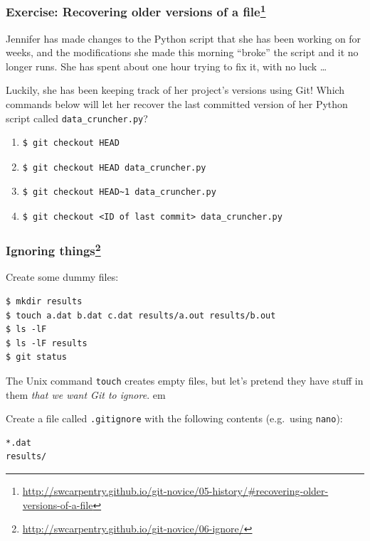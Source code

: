 \documentclass{beamer}
\newcommand{\correctans}{\textcolor{green!50!black}{\CheckmarkBold}}
\newcommand{\wrongans}{\textcolor{red!50!black}{\XSolidBold}}
\begin{document}
\begin{frame}[fragile]
\frametitle{Exercise: Recovering older versions of a file\footnote{\url{http://swcarpentry.github.io/git-novice/05-history/\#recovering-older-versions-of-a-file}}}

Jennifer has made changes to the Python script that she has been working on for weeks, and the modifications she made this morning ``broke'' the script and it no longer runs. She has spent about one hour trying to fix it, with no luck \dots \pause

Luckily, she has been keeping track of her project's versions using Git! Which commands below will let her recover the last committed version of her Python script called \texttt{data\_cruncher.py}?

\begin{enumerate}
\item \begin{verbatim}
$ git checkout HEAD
\end{verbatim}
\onslide<2->{\wrongans}
\item \begin{verbatim}
$ git checkout HEAD data_cruncher.py
\end{verbatim}
\onslide<2->{\correctans}
\item \begin{verbatim}
$ git checkout HEAD~1 data_cruncher.py
\end{verbatim}
\onslide<2->{\wrongans}
\item \begin{verbatim}
$ git checkout <ID of last commit> data_cruncher.py
\end{verbatim}
\onslide<2->{\correctans}
\end{enumerate}
\end{frame}

\begin{frame}[fragile]
\frametitle{Ignoring things\footnote{\url{http://swcarpentry.github.io/git-novice/06-ignore/}}}

Create some dummy files:
\begin{verbatim}
$ mkdir results
$ touch a.dat b.dat c.dat results/a.out results/b.out
$ ls -lF
$ ls -lF results
$ git status
\end{verbatim}
The Unix command \texttt{touch} creates empty files, but let's pretend they have stuff in them \emph{that we want Git to ignore}.
\pause
{} em

Create a file called \texttt{.gitignore} with the following contents (e.g.~using \texttt{nano}):
\begin{verbatim}
*.dat
results/
\end{verbatim}
\end{frame}
\end{document}
